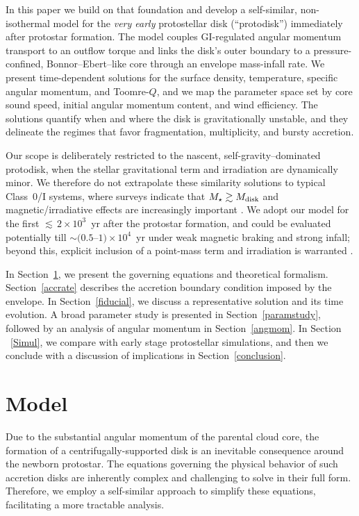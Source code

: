 \documentclass[twocolumn,linenumbers]{aastex631}
\begin{document}
In this paper we build on that foundation and develop a self-similar, non-isothermal model for the \emph{very early} protostellar disk (“protodisk”) immediately after protostar formation. The model couples GI-regulated angular momentum transport to an outflow torque and links the disk’s outer boundary to a pressure-confined, Bonnor–Ebert–like core through an envelope mass-infall rate. We present time-dependent solutions for the surface density, temperature, specific angular momentum, and Toomre-$Q$, and we map the parameter space set by core sound speed, initial angular momentum content, and wind efficiency. The solutions quantify when and where the disk is gravitationally unstable, and they delineate the regimes that favor fragmentation, multiplicity, and bursty accretion.

Our scope is deliberately restricted to the nascent, self-gravity–dominated protodisk, when the stellar gravitational term and irradiation are dynamically minor. We therefore do not extrapolate these similarity solutions to typical Class~0/I systems, where surveys indicate that $M_\star \gtrsim M_{\rm disk}$ and magnetic/irradiative effects are increasingly important \citep{maury2019characterizing,tobin2020vandam}. We adopt our model for the first ${\lesssim}\,2\times10^{3}$~yr after the protostar formation, and could be evaluated potentially till $\sim(0.5$–$1)\times10^{4}$~yr under weak magnetic braking and strong infall; beyond this, explicit inclusion of a point-mass term and irradiation is warranted \citep{shu1977,TerebeyShuCassen1984,tomida2015rmhd,tsukamoto2015effects,masson2016ad}.


In Section~\ref{model}, we present the governing equations and theoretical formalism. Section~\ref{accrate} describes the accretion boundary condition imposed by the envelope. In Section~\ref{fiducial}, we discuss a representative solution and its time evolution. A broad parameter study is presented in Section~\ref{paramstudy}, followed by an analysis of angular momentum in Section~\ref{angmom}. In Section ~\ref{Simul}, we compare with early stage protostellar simulations, and then we conclude with a discussion of implications in Section~\ref{conclusion}.


\section{Model} \label{model}

Due to the substantial angular momentum of the parental cloud core, the formation of a centrifugally-supported disk is an inevitable consequence around the newborn protostar. The equations governing the physical behavior of such accretion disks are inherently complex and challenging to solve in their full form. Therefore, we employ a self-similar approach to simplify these equations, facilitating a more tractable analysis.
\end{document}
